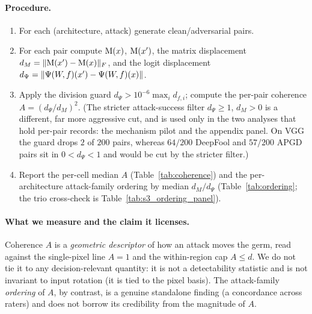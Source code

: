 \paragraph{Procedure.}
\begin{enumerate}
\item For each (architecture, attack) generate clean/adversarial pairs.
\item For each pair compute $\mathrm{M}(x)$, $\mathrm{M}(x')$, the matrix displacement
$d_M = \|\mathrm{M}(x')-\mathrm{M}(x)\|_F$, and the logit displacement
$d_\Psi = \|\Psi(W\!,f)(x')-\Psi(W\!,f)(x)\|$.
\item Apply the division guard $d_\Psi > 10^{-6}\max_i d_{f,i}$; compute the
per-pair coherence $A = (d_\Psi/d_M)^2$. (The stricter attack-success filter
$d_\Psi \ge 1$, $d_M > 0$ is a different, far more aggressive cut, and is used
only in the two analyses that hold per-pair records: the mechanism pilot and
the appendix panel. On VGG the guard drops $2$ of $200$ pairs, whereas
$64/200$ DeepFool and $57/200$ APGD pairs sit in $0 < d_\Psi < 1$ and would be
cut by the stricter filter.)
\item Report the per-cell median $A$ (Table~\ref{tab:coherence}) and the
per-architecture attack-family ordering by median $d_M/d_\Psi$
(Table~\ref{tab:ordering}; the trio cross-check is
Table~\ref{tab:s3_ordering_panel}).
\end{enumerate}




\paragraph{What we measure and the claim it licenses.}
Coherence $A$ is a \emph{geometric descriptor} of how an attack moves the
germ, read against the single-pixel line $A = 1$ and the within-region
cap $A \le d$. We do not tie it to any decision-relevant quantity: it is
not a detectability statistic and is not invariant to input rotation (it
is tied to the pixel basis). The attack-family \emph{ordering} of $A$,
by contrast, is a genuine standalone finding (a concordance across raters)
and does not borrow its credibility from the magnitude of $A$.

